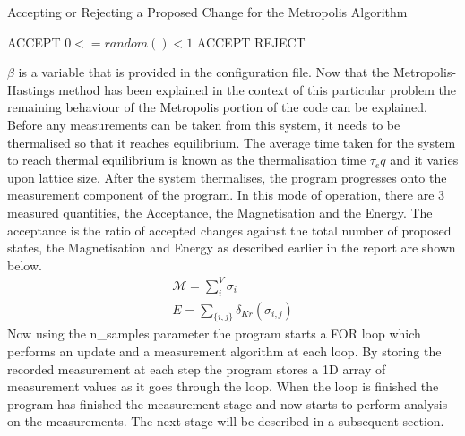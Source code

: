 \begin{algorithm}
\caption{Accepting or Rejecting a Proposed Change for the Metropolis Algorithm}
\begin{algorithmic}
\STATE ACCEPT
\ELSE
\STATE $0 <= random() < 1$
	\STATE ACCEPT
\ELSE
	\STATE REJECT
\ENDIF
\ENDIF
\end{algorithmic}
\end{algorithm}
$\beta$ is a variable that is provided in the configuration file.
Now that the Metropolis-Hastings method has been explained in the context of this particular problem the remaining behaviour of the Metropolis portion of the code can be explained.
Before any measurements can be taken from this system, it needs to be thermalised so that it reaches equilibrium.
The average time taken for the system to reach thermal equilibrium is known as the thermalisation time $\tau_eq$ and it varies upon lattice size.
After the system thermalises, the program progresses onto the measurement component of the program.
In this mode of operation, there are 3 measured quantities, the Acceptance, the Magnetisation and the Energy.
The acceptance is the ratio of accepted changes against the total number of proposed states, the Magnetisation and Energy as described earlier in the report are shown below.
\begin{equation}
\begin{split}
\mathcal{M}=\sum_{i}^{V}\sigma_i\\
E =\sum_{\{i,j\}}\delta_{Kr}(\sigma_{i,j})
\end{split}
\end{equation}
Now using the n\_samples parameter the program starts a FOR loop which performs an update and a measurement algorithm at each loop.
By storing the recorded measurement at each step the program stores a 1D array of measurement values as it goes through the loop.
When the loop is finished the program has finished the measurement stage and now starts to perform analysis on the measurements.
The next stage will be described in a subsequent section.

